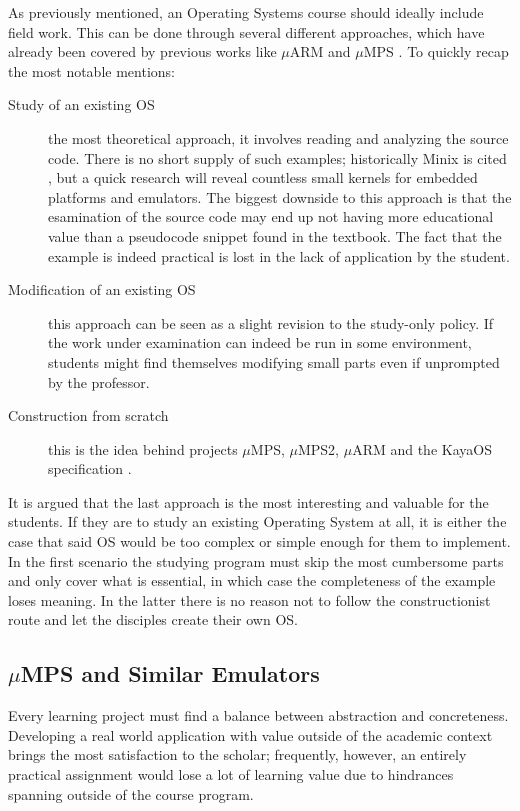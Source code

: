 \documentclass[12pt,a4paper,openright,twoside]{report}
\begin{document}
As previously mentioned, an Operating Systems course should ideally include
field work. This can be done through several different approaches, which
have already been covered by previous works like $\mu$ARM and $\mu$MPS
\cite{tesijonjic} \cite{tesimelletti}.
To quickly recap the most notable mentions:
\begin{description}
    \item[Study of an existing OS] the most theoretical approach, it involves
        reading and analyzing the source code. There is no short supply of such
        examples; historically Minix is cited \cite{minix}, but a quick research
        will reveal countless small kernels for embedded platforms and emulators.
        The biggest downside to this approach is that the esamination of the source
        code may end up not having more educational value than a pseudocode snippet
        found in the textbook. The fact that the example is indeed practical is 
        lost in the lack of application by the student.
    \item[Modification of an existing OS] this approach can be seen as a slight
        revision to the study-only policy. If the work under examination can indeed
        be run in some environment, students might find themselves modifying small
        parts even if unprompted by the professor.
    \item[Construction from scratch] this is the idea behind projects $\mu$MPS, 
        $\mu$MPS2, $\mu$ARM and the KayaOS specification \cite{davolimorsiani}.
\end{description}

It is argued that the last approach is the most interesting and valuable for 
the students. If they are to study an existing Operating System at all, it is
either the case that said OS would be too complex or simple enough for them 
to implement. In the first scenario the studying program must skip the most cumbersome
parts and only cover what is essential, in which case the completeness 
of the example loses meaning. In the latter there is no reason not to follow 
the constructionist route and let the disciples create their own OS.

\subsection{$\mu$MPS and Similar Emulators}
Every learning project must find a balance between abstraction and concreteness.
Developing a real world application with value outside of the academic context
 brings the most satisfaction to the scholar; frequently, however, an entirely
 practical assignment would lose a lot of learning value due to hindrances
 spanning outside of the course program.
 
\end{document}
